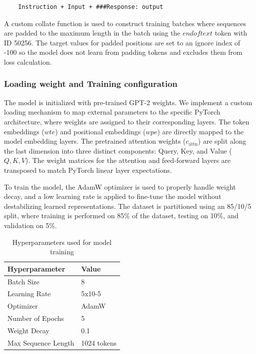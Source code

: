 \begin{verbatim}
	Instruction + Input + ###Response: output
\end{verbatim}

A custom collate function is used to construct training batches where sequences are padded to the maximum length in the batch using the $endoftext$ token with ID 50256. The target values for padded positions are set to an ignore index of -100 so the model does not learn from padding tokens and excludes them from loss calculation. 

\subsubsection{Loading weight and Training configuration}
The model is initialized with pre-trained GPT-2 weights. We implement a custom loading mechanism to map external parameters to the specific PyTorch architecture, where weights are assigned to their corresponding layers. The token embeddings ($wte$) and positional embeddings ($wpe$) are directly mapped to the model embedding layers. The pretrained attention weights ($c_{\text{attn}}$) are split along the last dimension into three distinct components: Query, Key, and Value ($Q, K, V$). The weight matrices for the attention and feed-forward layers are transposed to match PyTorch linear layer expectations.

To train the model, the AdamW optimizer is used to properly handle weight decay, and a low learning rate is applied to fine-tune the model without destabilizing learned representations. The dataset is partitioned using an 85/10/5 split, where training is performed on 85\% of the dataset, testing on 10\%, and validation on 5\%.

\begin{table}[h]
	\caption{Hyperparameters used for model training}
	\centering
	\begin{tabular}{|l|l|}
		\hline
		\textbf{Hyperparameter} & \textbf{Value} \\
		\hline
		Batch Size &  8\\
		Learning Rate & 5x10-5 \\
		Optimizer & AdamW \\
		Number of Epochs &  5\\
		Weight Decay &  0.1\\
		Max Sequence Length & 1024 tokens \\
		\hline
	\end{tabular}
\end{table}


